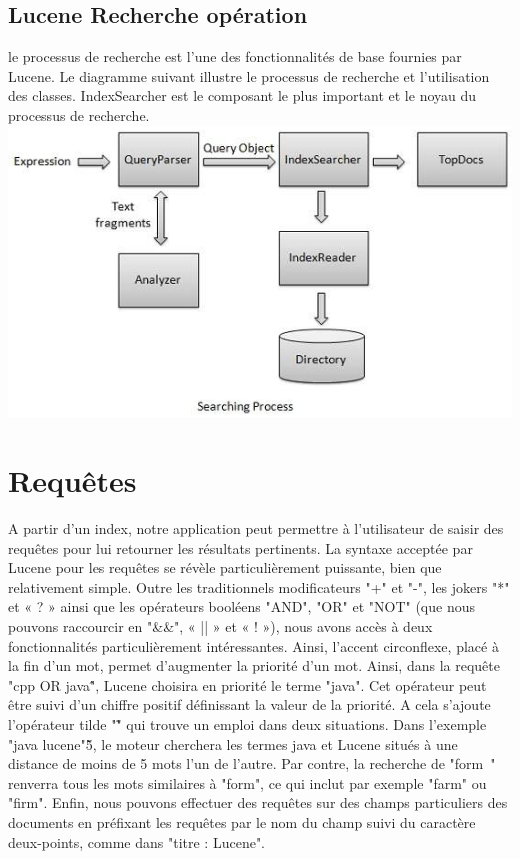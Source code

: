 \documentclass[12pt]{report}
\begin{document}
\subsection{Lucene Recherche opération}
le processus de recherche est l'une des fonctionnalités de base fournies par Lucene. Le diagramme suivant illustre le processus de recherche et l'utilisation des classes. IndexSearcher est le composant le plus important et le noyau du processus de recherche.
\newline\newline\newline
  \includegraphics[height=\dimexpr6\textheight/16\relax]{1}
    
 
\section{Requêtes}
\begin{frame}


A partir d'un index, notre application peut permettre à l'utilisateur de saisir des requêtes pour lui retourner les résultats pertinents. La syntaxe acceptée par Lucene pour les requêtes se révèle particulièrement puissante, bien que relativement simple. Outre les traditionnels modificateurs "+" et "-", les jokers "*" et « ? » ainsi que les opérateurs booléens "AND", "OR" et "NOT" (que nous pouvons raccourcir en "\&\&", « || » et « ! »), nous avons accès à deux fonctionnalités particulièrement intéressantes. Ainsi, l'accent circonflexe, placé à la fin d'un mot, permet d'augmenter la priorité d'un mot. Ainsi, dans la requête "cpp OR java\^", Lucene choisira en priorité le terme "java". Cet opérateur peut être suivi d'un chiffre positif définissant la valeur de la priorité. A cela s'ajoute l'opérateur tilde "\~" qui trouve un emploi dans deux situations. Dans l'exemple "java lucene"\~5, le moteur cherchera les termes java et Lucene situés à une distance de moins de 5 mots l'un de l'autre. Par contre, la recherche de "form~" renverra tous les mots similaires à "form", ce qui inclut par exemple "farm" ou "firm". Enfin, nous pouvons effectuer des requêtes sur des champs particuliers des documents en préfixant les requêtes par le nom du champ suivi du caractère deux-points, comme dans "titre : Lucene".
\end{frame}
\end{document}
